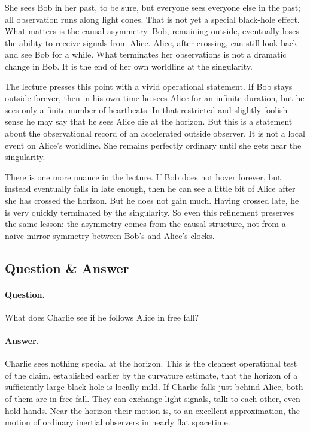 She sees Bob in her past, to be sure, but everyone sees everyone else in the past; all observation runs along light cones. That is not yet a special black-hole effect. What matters is the causal asymmetry. Bob, remaining outside, eventually loses the ability to receive signals from Alice. Alice, after crossing, can still look back and see Bob for a while. What terminates her observations is not a dramatic change in Bob. It is the end of her own worldline at the singularity.

The lecture presses this point with a vivid operational statement. If Bob stays outside forever, then in his own time he sees Alice for an infinite duration, but he sees only a finite number of heartbeats. In that restricted and slightly foolish sense he may say that he sees Alice die at the horizon. But this is a statement about the observational record of an accelerated outside observer. It is not a local event on Alice's worldline. She remains perfectly ordinary until she gets near the singularity.

There is one more nuance in the lecture. If Bob does not hover forever, but instead eventually falls in late enough, then he can see a little bit of Alice after she has crossed the horizon. But he does not gain much. Having crossed late, he is very quickly terminated by the singularity. So even this refinement preserves the same lesson: the asymmetry comes from the causal structure, not from a naive mirror symmetry between Bob's and Alice's clocks.

\subsection{Question \& Answer}

\paragraph{Question.} What does Charlie see if he follows Alice in free fall?

\paragraph{Answer.} Charlie sees nothing special at the horizon. This is the cleanest operational test of the claim, established earlier by the curvature estimate, that the horizon of a sufficiently large black hole is locally mild. If Charlie falls just behind Alice, both of them are in free fall. They can exchange light signals, talk to each other, even hold hands. Near the horizon their motion is, to an excellent approximation, the motion of ordinary inertial observers in nearly flat spacetime.

